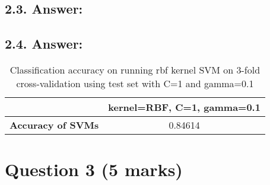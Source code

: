 \documentclass{article}
\begin{document}
\subsection*{2.3. Answer:}
\begin{table}[!hbt]
    \centering
    \caption{Classification accuracy on running rbf kernel SVM on 3-fold cross-validation using training set with parameter gamma in \{0.01, 0.05, 0.1, 0.5, 1\} and different values of the parameter C in \{0.01, 0.05, 0.1, 0.5, 1\}}
    \label{tab:rbfSVM}
\end{table}

\subsection*{2.4. Answer:}

\begin{table}[!htb]
    \centering
    \begin{tabular}{ll}
        \hline
        \multicolumn{1}{|c|}{\textbf{}} & \multicolumn{1}{c|}{\textbf{kernel=RBF, C=1, gamma=0.1}} \\ \hline
        \multicolumn{1}{|c|}{\textbf{Accuracy of SVMs}} & \multicolumn{1}{c|}{0.84614} \\ \hline
    \end{tabular}
    \caption{Classification accuracy on running rbf kernel SVM on 3-fold cross-validation using test set with C=1 and gamma=0.1}
    \label{tab:OptimalSVM}
\end{table}

\section{Question 3 (5 marks)}
\end{document}

